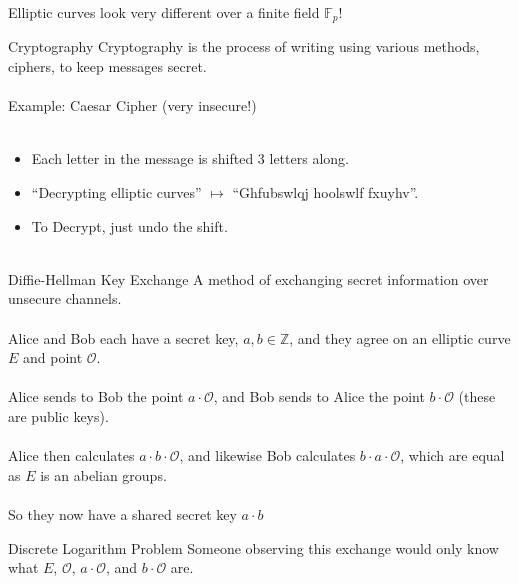 \documentclass{beamer}
\begin{document}
\begin{frame}
	Elliptic curves look very different over a finite field $\mathbb{F}_{p}$!	
\end{frame}

\begin{frame}[t]{Cryptography}
	Cryptography is the process of writing using various methods, ciphers, to keep messages secret. \\~\\
	
	Example: Caesar Cipher (very insecure!) \\~\\
	\begin{itemize}
		\item Each letter in the message is shifted 3 letters along.
		\item ``Decrypting elliptic curves'' $\mapsto$ ``Ghfubswlqj hoolswlf fxuyhv''.
		\item To Decrypt, just undo the shift. \\~\\
	\end{itemize}
\end{frame}

\begin{frame}[t]{Diffie-Hellman Key Exchange}
	A method of exchanging secret information over unsecure channels. \\~\\
	
	Alice and Bob each have a secret key, $a, b \in \mathbb{Z}$, and they agree on an elliptic curve $E$ and point $\mathcal{O}$. \\~\\
	
	Alice sends to Bob the point $a \cdot \mathcal{O}$, and Bob sends to Alice the point $b \cdot \mathcal{O}$ (these are public keys). \\~\\
	
	Alice then calculates $a \cdot b \cdot \mathcal{O}$, and likewise Bob calculates $b \cdot a \cdot \mathcal{O}$, which are equal as $E$ is an abelian groups. \\~\\
	
	So they now have a shared secret key $a \cdot b$
\end{frame}

\begin{frame}[t]{Discrete Logarithm Problem}
	Someone observing this exchange would only know what $E$, $\mathcal{O}$, $a\cdot \mathcal{O}$, and $b\cdot \mathcal{O}$ are. \\~\\
	
	
	
\end{frame}
\end{document}
